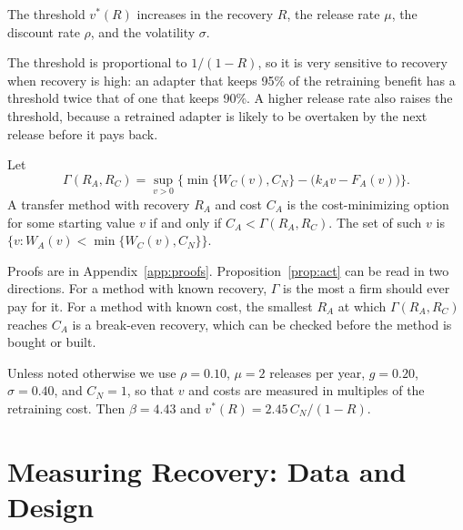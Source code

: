 \documentclass[ijds,blindrev]{informs4}
\begin{document}
\begin{proposition}\label{prop:cs}
The threshold $v^*(R)$ increases in the recovery $R$, the release rate $\mu$, the discount rate $\rho$, and the volatility $\sigma$.
\end{proposition}

The threshold is proportional to $1/(1-R)$, so it is very sensitive to recovery when recovery is high: an adapter that keeps 95\% of the retraining benefit has a threshold twice that of one that keeps 90\%. A higher release rate also raises the threshold, because a retrained adapter is likely to be overtaken by the next release before it pays back.

\begin{proposition}\label{prop:act}
Let
\begin{equation}\label{eq:gamma}
\Gamma(R_A,R_C)=\sup_{v>0}\Big\{\min\{W_C(v),C_N\}-\big(k_Av-F_A(v)\big)\Big\}.
\end{equation}
A transfer method with recovery $R_A$ and cost $C_A$ is the cost-minimizing option for some starting value $v$ if and only if $C_A<\Gamma(R_A,R_C)$. The set of such $v$ is $\{v: W_A(v)<\min\{W_C(v),C_N\}\}$.
\end{proposition}

Proofs are in Appendix~\ref{app:proofs}. Proposition~\ref{prop:act} can be read in two directions. For a method with known recovery, $\Gamma$ is the most a firm should ever pay for it. For a method with known cost, the smallest $R_A$ at which $\Gamma(R_A,R_C)$ reaches $C_A$ is a break-even recovery, which can be checked before the method is bought or built.

Unless noted otherwise we use $\rho=0.10$, $\mu=2$ releases per year, $g=0.20$, $\sigma=0.40$, and $C_N=1$, so that $v$ and costs are measured in multiples of the retraining cost. Then $\beta=4.43$ and $v^*(R)=2.45\,C_N/(1-R)$.

\section{Measuring Recovery: Data and Design}\label{sec:design}
\end{document}
